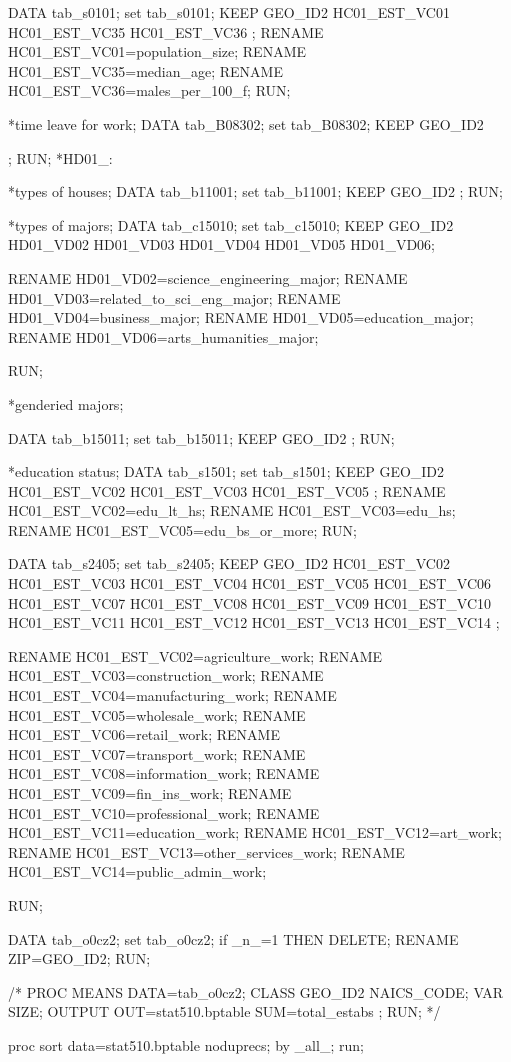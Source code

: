 \begin{SAScode}
DATA tab_s0101;
set tab_s0101;
KEEP GEO_ID2
HC01_EST_VC01
HC01_EST_VC35
HC01_EST_VC36
;
RENAME HC01_EST_VC01=population_size;
RENAME HC01_EST_VC35=median_age;
RENAME HC01_EST_VC36=males_per_100_f;
RUN;

*time leave for work;
DATA tab_B08302;
set tab_B08302;
KEEP GEO_ID2

;
RUN;
*HD01_:

*types of houses;
DATA tab_b11001;
set tab_b11001;
KEEP GEO_ID2
;
RUN;

*types of majors;
DATA tab_c15010;
set tab_c15010;
KEEP GEO_ID2
HD01_VD02
HD01_VD03
HD01_VD04
HD01_VD05
HD01_VD06;

RENAME HD01_VD02=science_engineering_major;
RENAME HD01_VD03=related_to_sci_eng_major;
RENAME HD01_VD04=business_major;
RENAME HD01_VD05=education_major;
RENAME HD01_VD06=arts_humanities_major;

RUN;


*genderied majors;

DATA tab_b15011;
set tab_b15011;
KEEP GEO_ID2
;
RUN;

*education status;
DATA tab_s1501;
set tab_s1501;
KEEP GEO_ID2
HC01_EST_VC02
HC01_EST_VC03
HC01_EST_VC05
;
RENAME HC01_EST_VC02=edu_lt_hs;
RENAME HC01_EST_VC03=edu_hs;
RENAME HC01_EST_VC05=edu_bs_or_more;
RUN;

DATA tab_s2405;
set tab_s2405;
KEEP GEO_ID2
HC01_EST_VC02
HC01_EST_VC03
HC01_EST_VC04
HC01_EST_VC05
HC01_EST_VC06
HC01_EST_VC07
HC01_EST_VC08
HC01_EST_VC09
HC01_EST_VC10
HC01_EST_VC11
HC01_EST_VC12
HC01_EST_VC13
HC01_EST_VC14
;

RENAME HC01_EST_VC02=agriculture_work;
RENAME HC01_EST_VC03=construction_work;
RENAME HC01_EST_VC04=manufacturing_work;
RENAME HC01_EST_VC05=wholesale_work;
RENAME HC01_EST_VC06=retail_work;
RENAME HC01_EST_VC07=transport_work;
RENAME HC01_EST_VC08=information_work;
RENAME HC01_EST_VC09=fin_ins_work;
RENAME HC01_EST_VC10=professional_work;
RENAME HC01_EST_VC11=education_work;
RENAME HC01_EST_VC12=art_work;
RENAME HC01_EST_VC13=other_services_work;
RENAME HC01_EST_VC14=public_admin_work;



RUN;


DATA tab_o0cz2;
set tab_o0cz2;
if _n_=1 THEN DELETE;
RENAME ZIP=GEO_ID2;
RUN;

/*
PROC MEANS DATA=tab_o0cz2;
  CLASS GEO_ID2 NAICS_CODE;
  VAR SIZE;
  OUTPUT OUT=stat510.bptable SUM=total_estabs ;
RUN;
*/

proc sort data=stat510.bptable noduprecs;
by _all_;
run;


\end{SAScode}
